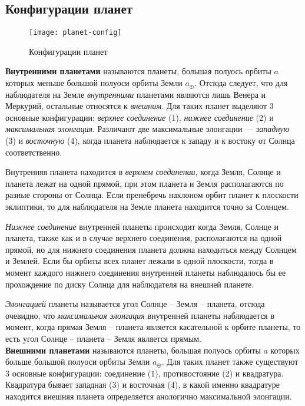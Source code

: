 \subsection{Конфигурации планет}

\begin{figure}[h!]
\centering
\texttt{[image: planet-config]}
\caption{Конфигурации планет}
\end{figure}

{\bfseries Внутренними планетами} называются планеты, большая полуось орбиты 
$a$ которых меньше большой полуоси орбиты Земли $a_\oplus$. Отсюда следует, что 
для наблюдателя на Земле {\itshape внутренними} планетами являются лишь Венера 
и Меркурий, остальные относятся к {\itshape внешним}. Для таких планет выделяют 
3 основные конфигурации: {\itshape верхнее соединение} (1), {\itshape нижнее 
соединение} (2) и {\itshape максимальная элонгация}. Различают две максимальные 
элонгации --- {\itshape западную} (3) и {\itshape восточную} (4), когда планета 
наблюдается к западу и к востоку от Солнца соответственно.

Внутренняя планета находится в {\itshape верхнем соединении}, когда Земля, 
Солнце и планета лежат на одной прямой, при этом планета и Земля располагаются 
по разные стороны от Солнца. Если пренебречь наклоном орбит планет к плоскости 
эклиптики, то для наблюдателя на Земле планета находится точно за Солнцем.

{\itshape Нижнее соединение} внутренней планеты происходит когда Земля, Солнце 
и планета, также как и в случае верхнего соединения, располагаются на одной 
прямой, но для нижнего соединения планета должна находиться между Солнцем и 
Землей. Если бы орбиты всех планет лежали в одной плоскости, тогда в момент 
каждого нижнего соединения внутренней планеты наблюдалось бы ее прохождение по 
диску Солнца для наблюдателя на внешней планете.

{\itshape Элонгацией} планеты называется угол Солнце -- Земля -- планета, 
отсюда очевидно, что {\itshape максимальная элонгация} внутренней планеты 
наблюдается в момент, когда прямая Земля -- планета является касательной к 
орбите планеты, то есть угол Солнце -- планета -- Земля является прямым.\\

{\bfseries Внешними планетами} называются планеты, большая полуось орбиты $a$ 
которых больше большой полуоси орбиты Земли $a_\oplus$. Для таких планет также 
существуют 3 основные конфигурации: соединение (1), противостояние (2) и 
квадратура. Квадратура бывает западная (3) и восточная (4), в какой именно 
квадратуре находится внешняя планета определяется анологично максимальной 
элонгации.

